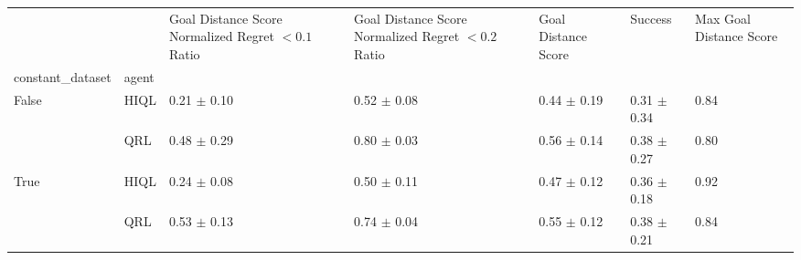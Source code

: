 \begin{tabular}{lllllll}
\toprule
 &  & Goal Distance Score Normalized Regret $< 0.1$ Ratio & Goal Distance Score Normalized Regret $< 0.2$ Ratio & Goal Distance Score & Success & Max Goal Distance Score \\
constant_dataset & agent &  &  &  &  &  \\
\midrule
\multirow[t]{2}{*}{False} & HIQL & 0.21 $\pm$ 0.10 & 0.52 $\pm$ 0.08 & 0.44 $\pm$ 0.19 & 0.31 $\pm$ 0.34 & 0.84 \\
 & QRL & 0.48 $\pm$ 0.29 & 0.80 $\pm$ 0.03 & 0.56 $\pm$ 0.14 & 0.38 $\pm$ 0.27 & 0.80 \\
\cline{1-7}
\multirow[t]{2}{*}{True} & HIQL & 0.24 $\pm$ 0.08 & 0.50 $\pm$ 0.11 & 0.47 $\pm$ 0.12 & 0.36 $\pm$ 0.18 & 0.92 \\
 & QRL & 0.53 $\pm$ 0.13 & 0.74 $\pm$ 0.04 & 0.55 $\pm$ 0.12 & 0.38 $\pm$ 0.21 & 0.84 \\
\cline{1-7}
\bottomrule
\end{tabular}
